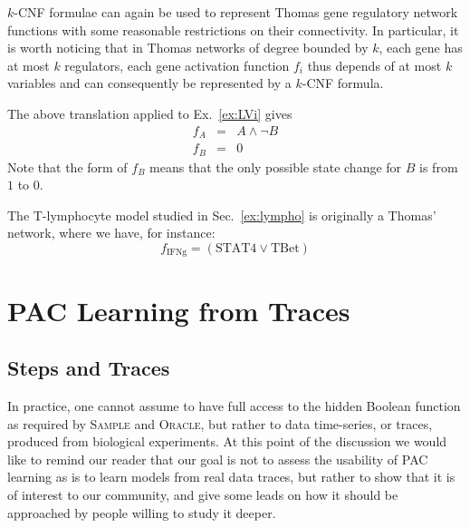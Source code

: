 \documentclass{llncs}
\begin{document}
$k$-CNF formulae can again be used to represent Thomas gene regulatory network functions with some reasonable restrictions on their connectivity.
In particular, it is worth noticing that in Thomas networks of degree bounded by $k$,
each gene has at most $k$ regulators, each gene activation function $f_i$ thus depends of at most $k$ variables
and can consequently be represented by a $k$-CNF formula.

\begin{example}
   The above translation applied to
   Ex.~\ref{ex:LVi} gives
   \begin{eqnarray*}
   f_A &=& A \wedge\neg B\\
   f_B &=& 0
   \end{eqnarray*}
   Note that the form of $f_B$ means that the only possible state change
   for $B$ is from $1$ to $0$. 
\end{example}

\begin{example}
   The T-lymphocyte model studied in Sec.~\ref{ex:lympho} is originally a Thomas' network, where we have, for
   instance:
   \[f_\text{IFNg}=(\text{STAT4}\vee \text{TBet})\]
\end{example}

\section{PAC Learning from Traces} %


\subsection{Steps and Traces}

In practice, one cannot assume to have full access to the hidden Boolean function as required by
\textsc{Sample} and \textsc{Oracle}, but rather to data time-series, or traces,
produced from biological experiments. At this point of the discussion we would like to remind our reader that our goal is not to assess the usability of PAC learning as is to learn models from real data traces, but rather to show that it is of interest to our community, and give some leads on how it should be approached by people willing to study it deeper.
\end{document}
